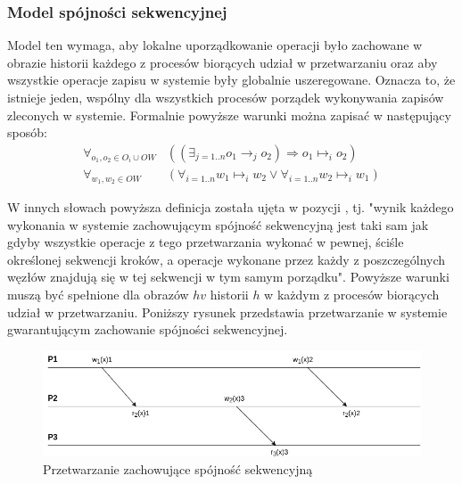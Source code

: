 \subsubsection{Model spójności sekwencyjnej}


Model ten wymaga, aby lokalne uporządkowanie operacji było zachowane w obrazie historii każdego z procesów biorących udział w przetwarzaniu oraz aby wszystkie operacje zapisu w systemie były globalnie uszeregowane. Oznacza to, że istnieje jeden, wspólny dla wszystkich procesów porządek wykonywania zapisów zleconych w systemie. Formalnie powyższe warunki można zapisać w następujący sposób:
\begin{align*}
    \forall_{o_1, o_2 \in O_i \cup OW} &(( \exists_{j = 1..n} o_1 \rightarrow_j o_2) \Rightarrow o_1 \mapsto_i o_2) \\
    \forall_{w_1, w_2 \in OW} &(\forall_{i = 1..n} w_1 \mapsto_i w_2 \vee \forall_{i = 1..n} w_2 \mapsto_i w_1)
\end{align*}

W innych słowach powyższa definicja została ujęta w pozycji \cite{adve:90b}, tj. "wynik każdego wykonania w systemie zachowującym spójność sekwencyjną jest taki sam jak gdyby wszystkie operacje z tego przetwarzania wykonać w pewnej, ściśle określonej sekwencji kroków, a operacje wykonane przez każdy z poszczególnych węzłów znajdują się w tej sekwencji w tym samym porządku". Powyższe warunki muszą być spełnione dla obrazów $ hv $ historii $ h $ w każdym z procesów biorących udział w przetwarzaniu. Poniższy rysunek przedstawia przetwarzanie w systemie gwarantującym zachowanie spójności sekwencyjnej.

\begin{figure}
    \includegraphics[width=\linewidth]{images/02-sequential.png}
    \caption{Przetwarzanie zachowujące spójność sekwencyjną}
    \label{figure:replication_sequential}
\end{figure}

